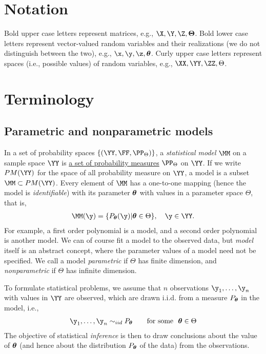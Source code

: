 \section{Notation}
Bold upper case letters represent matrices, e.g., $\X, \Y, \Z, \bTheta$. Bold lower case letters represent vector-valued random variables and their realizations (we do not distinguish between the two), e.g., $\x, \y, \z, \btheta$. Curly upper case letters represent spaces (i.e., possible values) of random variables, e.g., $\XX, \YY, \ZZ, \Theta$.

\section{Terminology}
\subsection{Parametric and nonparametric models}
In a set of probability spaces $\{(\YY, \FF, \PP_\Theta)\}$, a {\em{statistical model}} $\MM$ on a sample space $\YY$ is {\underline{a set of probability measures}} $\PP_\Theta$ on $\YY$. If we write $PM(\YY)$ for the space of all probability measure on $\YY$, a model is a subset $\MM \subset PM(\YY)$. Every element of $\MM$ has a one-to-one mapping (hence the model is {\em{identifiable}}) with its parameter ${\boldsymbol{\theta}}$ with values in a parameter space $\Theta$, that is,
\begin{align}
\MM(\y) = \{P_\btheta(\y) | \btheta \in \Theta\},\quad \y \in \YY.
\end{align}
For example, a first order polynomial is a model, and a second order polynomial is another model. We can of course fit a model to the observed data, but {\em{model}} itself is an abstract concept, where the parameter values of a model need not be specified. We call a model {\em{parametric}} if $\Theta$ has finite dimension, and {\em{nonparametric}} if $\Theta$ has infinite dimension.

To formulate statistical problems, we assume that $n$ observations $\y_1,\dots,\y_n$ with values in $\YY$ are observed, which are drawn i.i.d. from a measure $P_{\boldsymbol{\theta}}$ in the model, i.e.,
\begin{align}
\y_1, \dots, \y_n \sim_{iid} P_\btheta \qquad \text{for some}~~ \btheta \in \Theta
\end{align}
The objective of statistical {\em{inference}} is then to draw conclusions about the value of ${\boldsymbol{\theta}}$ (and hence about the distribution $P_{\boldsymbol{\theta}}$ of the data) from the observations.


